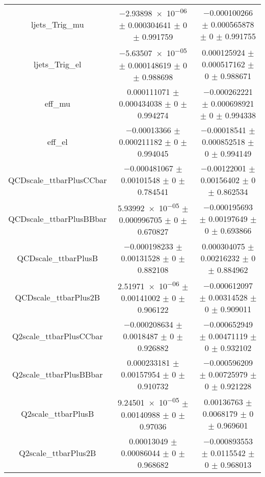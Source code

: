 \begin{table}
\begin{tabular}{ccc}
ljets\_Trig\_mu & \num{-2.93898e-06} $\pm$ \num{0.000304641} $\pm$ \num{0} $\pm$ \num{0.991759} & \num{-0.000100266} $\pm$ \num{0.000565878} $\pm$ \num{0} $\pm$ \num{0.991755}\\
ljets\_Trig\_el & \num{-5.63507e-05} $\pm$ \num{0.000148619} $\pm$ \num{0} $\pm$ \num{0.988698} & \num{0.000125924} $\pm$ \num{0.000517162} $\pm$ \num{0} $\pm$ \num{0.988671}\\
eff\_mu & \num{0.000111071} $\pm$ \num{0.000434038} $\pm$ \num{0} $\pm$ \num{0.994274} & \num{-0.000262221} $\pm$ \num{0.000698921} $\pm$ \num{0} $\pm$ \num{0.994338}\\
eff\_el & \num{-0.00013366} $\pm$ \num{0.000211182} $\pm$ \num{0} $\pm$ \num{0.994045} & \num{-0.00018541} $\pm$ \num{0.000852518} $\pm$ \num{0} $\pm$ \num{0.994149}\\
QCDscale\_ttbarPlusCCbar & \num{-0.000481067} $\pm$ \num{0.00101548} $\pm$ \num{0} $\pm$ \num{0.784541} & \num{-0.00122001} $\pm$ \num{0.00156402} $\pm$ \num{0} $\pm$ \num{0.862534}\\
QCDscale\_ttbarPlusBBbar & \num{5.93992e-05} $\pm$ \num{0.000996705} $\pm$ \num{0} $\pm$ \num{0.670827} & \num{-0.000195693} $\pm$ \num{0.00197649} $\pm$ \num{0} $\pm$ \num{0.693866}\\
QCDscale\_ttbarPlusB & \num{-0.000198233} $\pm$ \num{0.00131528} $\pm$ \num{0} $\pm$ \num{0.882108} & \num{0.000304075} $\pm$ \num{0.00216232} $\pm$ \num{0} $\pm$ \num{0.884962}\\
QCDscale\_ttbarPlus2B & \num{2.51971e-06} $\pm$ \num{0.00141002} $\pm$ \num{0} $\pm$ \num{0.906122} & \num{-0.000612097} $\pm$ \num{0.00314528} $\pm$ \num{0} $\pm$ \num{0.909011}\\
Q2scale\_ttbarPlusCCbar & \num{-0.000208634} $\pm$ \num{0.0018487} $\pm$ \num{0} $\pm$ \num{0.926882} & \num{-0.000652949} $\pm$ \num{0.00471119} $\pm$ \num{0} $\pm$ \num{0.932102}\\
Q2scale\_ttbarPlusBBbar & \num{0.000233181} $\pm$ \num{0.00157954} $\pm$ \num{0} $\pm$ \num{0.910732} & \num{-0.000596209} $\pm$ \num{0.00725979} $\pm$ \num{0} $\pm$ \num{0.921228}\\
Q2scale\_ttbarPlusB & \num{9.24501e-05} $\pm$ \num{0.00140988} $\pm$ \num{0} $\pm$ \num{0.97036} & \num{0.00136763} $\pm$ \num{0.0068179} $\pm$ \num{0} $\pm$ \num{0.969601}\\
Q2scale\_ttbarPlus2B & \num{0.00013049} $\pm$ \num{0.00086044} $\pm$ \num{0} $\pm$ \num{0.968682} & \num{-0.000893553} $\pm$ \num{0.0115542} $\pm$ \num{0} $\pm$ \num{0.968013}\\

\end{tabular}
\end{table}
